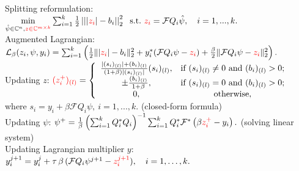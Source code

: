 \documentclass[a0paper,portrait]{baposter}
\newcommand{\st}{\;\mathrm{s.t.}\;}
\begin{document}
\begin{poster}
{{\color{blue} Splitting reformulation:}
$\min\limits_{\hat \psi\in \mathbb{C}^{n}, {\color{red}z\in
\mathbb{C}^{m\times k}}}\sum_{i=1}^k
\frac{1}{2}\left|\left||{\color{red}z_i}| - b_i\right|\right|_2^2
\quad ~\st~  {\color{red}z_i} = \mathcal{F} Q_i \hat \psi, \quad i =
1,...,k.$\\[1mm]
%
{\color{blue} Augmented Lagrangian:}
$\mathcal{L}_{\beta}(z_i,\psi, y_i) = \sum_{i=1}^k \left(\frac{1}{2}
\| |{\color{red}z_i}| - b_i\|_2^2 + y_i^* (\mathcal{F} Q_i \psi -
{\color{red}z_i}) + \frac{\beta}{2}\|\mathcal{F} Q_i \psi -
{\color{red}z_i}\|_2^2 \right).$\\[1mm]
%
{\color{blue} Updating $z$:}  ${\color{red}(z_i^+)_{(l)}}= \left\{\begin{array}{cc}
\frac{|(s_i)_{(l)}|+(b_i)_{(l)}}{(1+\beta)|(s_i)_{(l)}|}(s_i)_{(l)},
& \mbox{if\ }
(s_i)_{(l)}\neq 0 \mbox{\ and\ } (b_i)_{(l)}> 0;  \\
\pm\frac{(b_i)_{(l)}}{1+\beta}, & \mbox{if\ }
(s_i)_{(l)}= 0 \mbox{\ and\ } (b_i)_{(l)}> 0;\\
0, & \mbox{otherwise},\\
\end{array}\right.$ \\
\indent\qquad\qquad\qquad where $s_i = y_i + \beta\mathcal{F} Q_i\psi,\ i=1,...,k$. (closed-form formula)\\[1mm]
%
{\color{blue} Updating $\psi$:} $\psi^+ = \frac{1}{\beta} \left(\sum _{i=1}^k Q_i^* Q_i
\right)^{-1}\sum _{i=1}^k Q_i^* \mathcal{F}^* \left( \beta
{\color{red}z_i^+} - y_i \right).$ (solving linear system)\\[1mm]
%
{\color{blue} Updating Lagrangian multiplier $y$:} $y_i^{j+1}= y_i^j + \tau\,\beta\, (\mathcal{F} Q_i \psi^{j+1} -
{\color{red}z_i^{j+1}}), \quad i = 1, \ldots, k.$
}


\end{poster}
\end{document}
